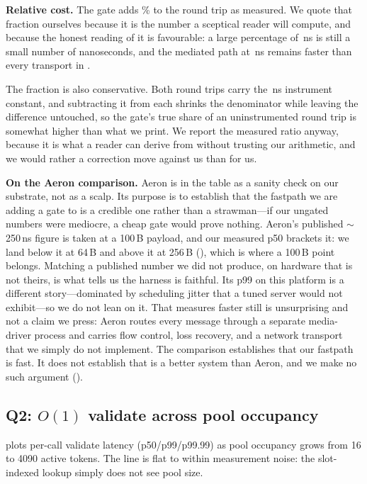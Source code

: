 \textbf{Relative cost.} The gate adds \gateOverheadPercent\% to the
round trip as measured. We quote that fraction ourselves because it is
the number a sceptical reader will compute, and because the honest
reading of it is favourable: a large percentage of \rawAstraRTT\,ns is
still a small number of nanoseconds, and the mediated path at
\gatedAstraRTT\,ns remains faster than every transport in
.

The fraction is also conservative. Both round trips carry the
\timerFloor\,ns instrument constant, and subtracting it from each
shrinks the denominator while leaving the difference untouched, so the
gate's true share of an uninstrumented round trip is somewhat higher
than what we print. We report the measured ratio anyway, because it is
what a reader can derive from  without trusting our
arithmetic, and we would rather a correction move against us than for
us.

\textbf{On the Aeron comparison.} Aeron is in the table as a sanity
check on our substrate, not as a scalp. Its purpose is to establish
that the fastpath we are adding a gate to is a credible one rather
than a strawman---if our ungated numbers were mediocre, a cheap gate
would prove nothing. Aeron's published $\sim$250\,ns figure is taken at
a 100\,B payload, and our measured p50 brackets it: we land below it at
64\,B and above it at 256\,B (), which is where a
100\,B point belongs. Matching a published number we did not produce,
on hardware that is not theirs, is what tells us the harness is
faithful. Its p99 on this platform is a different story---dominated by
scheduling jitter that a tuned server would not exhibit---so we do not
lean on it. That \sysname measures faster
still is unsurprising and not a claim we press: Aeron routes every
message through a separate media-driver process and carries flow
control, loss recovery, and a network transport that we simply do not
implement. The comparison establishes that our fastpath is fast. It
does not establish that \sysname is a better system than Aeron, and
we make no such argument ().

\subsection{Q2: $O(1)$ validate across pool occupancy}
\label{sec:eval:o1}

 plots per-call validate latency (p50/p99/p99.99)
as pool occupancy grows from 16 to 4090 active tokens. The line is
flat to within measurement noise: the slot-indexed lookup simply does
not see pool size.

